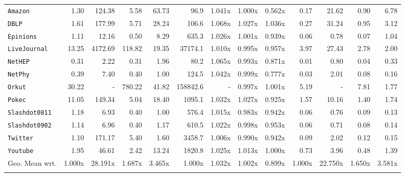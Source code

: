 \documentclass[10pt,journal,compsoc]{IEEEtran}
\newcommand\acro{{\sc{HyperFuseR\xspace}\xspace}\xspace}
\begin{document}
\begin{table}
{\begin{tabular}{l|rrrr|rrrr|rrrr}
\midrule
{\tt Amazon}       &       1.30 &  124.38 &   5.58 & 63.73 &       96.9 &  1.041x &  1.000x &  0.562x &       0.17 & 21.62 & 0.90 & 6.78 \\
{\tt DBLP}         &       1.61 &  177.99 &   5.71 & 28.24 &      106.6 &  1.068x &  1.027x &  1.036x &       0.27 & 31.24 & 0.95 & 3.12 \\
{\tt Epinions}     &       1.11 &   12.16 &   0.50 &  8.29 &      635.3 &  1.026x &  1.001x &  0.939x &       0.06 &  0.78 & 0.07 & 1.04 \\
{\tt LiveJournal}  &      13.25 & 4172.69 & 118.82 & 19.35 &    37174.1 &  1.010x &  0.995x &  0.957x &       3.97 & 27.43 & 2.78 & 2.00 \\
{\tt NetHEP}       &       0.31 &    2.22 &   0.31 &  1.96 &       80.2 &  1.065x &  0.993x &  0.871x &       0.01 &  0.80 & 0.04 & 0.33 \\
{\tt NetPhy}       &       0.39 &    7.40 &   0.40 &  1.00 &      124.5 &  1.042x &  0.999x &  0.777x &       0.03 &  2.01 & 0.08 & 0.16 \\
{\tt Orkut}        &      30.22 &       - & 780.22 & 41.82 &   158842.6 &       - &  0.997x &  1.001x &       5.19 &     - & 7.81 & 1.77 \\
{\tt Pokec}        &      11.05 &  149.34 &   5.04 & 18.40 &     1095.1 &  1.032x &  1.027x &  0.925x &       1.57 & 10.16 & 1.40 & 1.74 \\
{\tt Slashdot0811} &       1.18 &    6.93 &   0.40 &  1.00 &      576.4 &  1.015x &  0.983x &  0.942x &       0.06 &  0.76 & 0.09 & 0.13 \\
{\tt Slashdot0902} &       1.14 &    6.96 &   0.40 &  1.17 &      610.5 &  1.022x &  0.998x &  0.953x &       0.06 &  0.71 & 0.08 & 0.14 \\
{\tt Twitter}      &       1.10 &  171.17 &   5.40 &  1.60 &     3458.7 &  1.006x &  0.990x &  0.942x &       0.09 &  2.02 & 0.12 & 0.15 \\
{\tt Youtube}      &       1.95 &   46.61 &   2.42 & 13.24 &     1820.8 &  1.025x &  1.013x &  1.000x &       0.73 &  3.96 & 0.48 & 1.39 \\
\bottomrule
Geo. Mean wrt.&1.000x&28.191x&1.687x&3.465x&1.000x&1.032x&1.002x&0.899x&1.000x&22.750x&1.650x&3.581x \\ \acro
\end{tabular}

    }
    \end{table}
    
\end{document}
